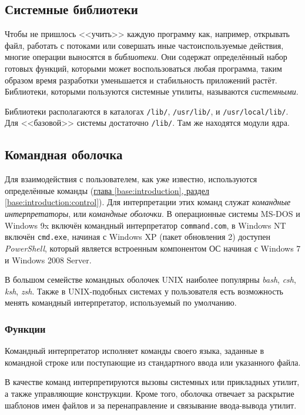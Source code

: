 \subsection{Системные библиотеки}\label{base:os:structure:libs}
Чтобы не пришлось <<учить>> каждую программу как, например, открывать файл, работать с потоками или совершать иные частоиспользуемые действия, многие операции выносятся в \emph{библиотеки}. Они содержат определённый набор готовых функций, которыми может воспользоваться любая программа, таким образом время разработки уменьшается и стабильность приложений растёт. Библиотеки, которыми пользуются системные утилиты, называются \emph{системными}.

Библиотеки располагаются в каталогах \texttt{/lib/}, \texttt{/usr/lib/}, и \texttt{/usr/lo\-cal/lib/}. Для <<базовой>> системы достаточно \texttt{/lib/}. Там же находятся модули ядра.

\subsection{Командная оболочка}\label{base:os:structure:shell}
Для взаимодействия с пользователем, как уже известно, используются определённые команды (\hyperref[base:introduction:control]{глава \ref*{base:introduction}, раздел \ref*{base:introduction:control}}).
Для интерпретации этих команд служат \emph{командные интерпретаторы}, или \emph{командные оболочки}. В операционные системы MS-DOS и Windows 9x включён командный интерпретатор \texttt{command.com}, в Windows NT включён \texttt{cmd.exe}, начиная с Windows XP (пакет обновления 2) доступен \emph{PowerShell}, который является встроенным компонентом ОС начиная с Windows 7 и Windows 2008 Server.

В большом семействе командных оболочек UNIX наиболее популярны \emph{bash}, \emph{csh}, \emph{ksh}, \emph{zsh}. Также в UNIX-подобных системах у пользователя есть возможность менять командный интерпретатор, используемый по умолчанию.

\subsubsection{Функции}
Командный интерпретатор исполняет команды своего языка, заданные в командной строке или поступающие из стандартного ввода или указанного файла.

В качестве команд интерпретируются вызовы системных или прикладных утилит, а также управляющие конструкции. Кроме того, оболочка отвечает за раскрытие шаблонов имен файлов и за перенаправление и связывание ввода-вывода утилит.

